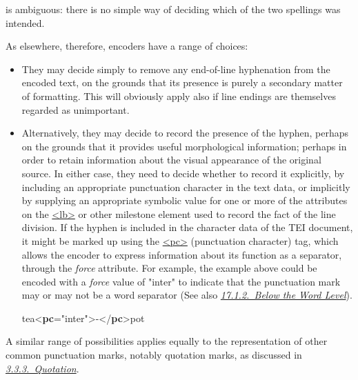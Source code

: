 \par\egroup 
 is ambiguous: there is no simple way of deciding which of the two spellings was intended.\par
As elsewhere, therefore, encoders have a range of choices: \begin{itemize}
\item They may decide simply to remove any end-of-line hyphenation from the encoded text, on the grounds that its presence is purely a secondary matter of formatting. This will obviously apply also if line endings are themselves regarded as unimportant.
\item Alternatively, they may decide to record the presence of the hyphen, perhaps on the grounds that it provides useful morphological information; perhaps in order to retain information about the visual appearance of the original source. In either case, they need to decide whether to record it explicitly, by including an appropriate punctuation character in the text data, or implicitly by supplying an appropriate symbolic value for one or more of the attributes on the \hyperref[TEI.lb]{<lb>} or other milestone element used to record the fact of the line division. If the hyphen is included in the character data of the TEI document, it might be marked up using the \hyperref[TEI.pc]{<pc>} (punctuation character) tag, which allows the encoder to express information about its function as a separator, through the {\itshape force} attribute. For example, the example above could be encoded with a {\itshape force} value of "inter" to indicate that the punctuation mark may or may not be a word separator (See also \textit{\hyperref[AIPC]{17.1.2.\ Below the Word Level}}). \par\bgroup{}\exampleFont \begin{shaded}\noindent\mbox{}tea{<\textbf{pc}\hspace*{1em}{force}="{inter}">}-{</\textbf{pc}>}pot\end{shaded}\egroup\par 
\end{itemize}  A similar range of possibilities applies equally to the representation of other common punctuation marks, notably quotation marks, as discussed in \textit{\hyperref[COHQQ]{3.3.3.\ Quotation}}.\par
